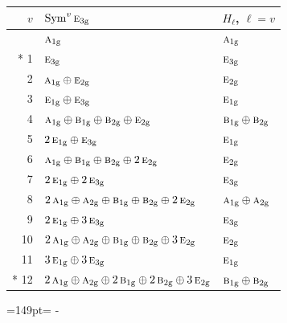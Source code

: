\documentclass[10pt,a4paper]{article}
\newcommand{\needspace}[1]{\par\penalty-100\begingroup\dimen0=#1\relax\dimen2=\pagegoal
  \advance\dimen2-\pagetotal\ifdim\dimen0>\dimen2\relax\ifdim\dimen2>0pt\vfil\break\fi\fi
  \endgroup}
\numberwithin{equation}{section}
\newcommand{\irr}[1]{\text{\normalfont\scshape #1}}
\newcommand{\ptag}[1]{\mathrm{#1}}
\begin{document}
{\small\begin{longtable}{@{}rll@{}}\toprule
$v$ & $\operatorname{Sym}^{v}\irr{e}_{3\ptag{g}}$ & $H_\ell$, $\ell = v$\\\midrule\endhead
\bottomrule\endfoot\endlastfoot
0 & $\irr{a}_{1\ptag{g}}$ & $\irr{a}_{1\ptag{g}}$\\*
1 & $\irr{e}_{3\ptag{g}}$ & $\irr{e}_{3\ptag{g}}$\\
2 & $\irr{a}_{1\ptag{g}} \oplus \irr{e}_{2\ptag{g}}$ & $\irr{e}_{2\ptag{g}}$\\
3 & $\irr{e}_{1\ptag{g}} \oplus \irr{e}_{3\ptag{g}}$ & $\irr{e}_{1\ptag{g}}$\\
4 & $\irr{a}_{1\ptag{g}} \oplus \irr{b}_{1\ptag{g}} \oplus \irr{b}_{2\ptag{g}} \oplus \irr{e}_{2\ptag{g}}$ & $\irr{b}_{1\ptag{g}} \oplus \irr{b}_{2\ptag{g}}$\\
5 & $2\,\irr{e}_{1\ptag{g}} \oplus \irr{e}_{3\ptag{g}}$ & $\irr{e}_{1\ptag{g}}$\\
6 & $\irr{a}_{1\ptag{g}} \oplus \irr{b}_{1\ptag{g}} \oplus \irr{b}_{2\ptag{g}} \oplus 2\,\irr{e}_{2\ptag{g}}$ & $\irr{e}_{2\ptag{g}}$\\
7 & $2\,\irr{e}_{1\ptag{g}} \oplus 2\,\irr{e}_{3\ptag{g}}$ & $\irr{e}_{3\ptag{g}}$\\
8 & $2\,\irr{a}_{1\ptag{g}} \oplus \irr{a}_{2\ptag{g}} \oplus \irr{b}_{1\ptag{g}} \oplus \irr{b}_{2\ptag{g}} \oplus 2\,\irr{e}_{2\ptag{g}}$ & $\irr{a}_{1\ptag{g}} \oplus \irr{a}_{2\ptag{g}}$\\
9 & $2\,\irr{e}_{1\ptag{g}} \oplus 3\,\irr{e}_{3\ptag{g}}$ & $\irr{e}_{3\ptag{g}}$\\
10 & $2\,\irr{a}_{1\ptag{g}} \oplus \irr{a}_{2\ptag{g}} \oplus \irr{b}_{1\ptag{g}} \oplus \irr{b}_{2\ptag{g}} \oplus 3\,\irr{e}_{2\ptag{g}}$ & $\irr{e}_{2\ptag{g}}$\\
11 & $3\,\irr{e}_{1\ptag{g}} \oplus 3\,\irr{e}_{3\ptag{g}}$ & $\irr{e}_{1\ptag{g}}$\\*
12 & $2\,\irr{a}_{1\ptag{g}} \oplus \irr{a}_{2\ptag{g}} \oplus 2\,\irr{b}_{1\ptag{g}} \oplus 2\,\irr{b}_{2\ptag{g}} \oplus 3\,\irr{e}_{2\ptag{g}}$ & $\irr{b}_{1\ptag{g}} \oplus \irr{b}_{2\ptag{g}}$\\
\bottomrule\end{longtable}}
\needspace{149pt}
\end{document}
